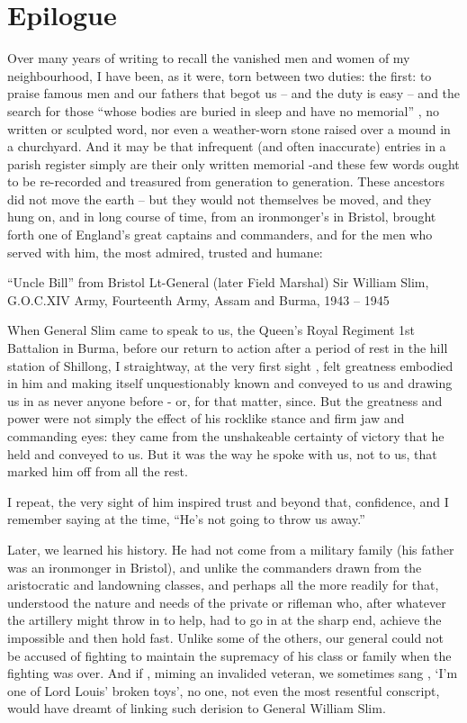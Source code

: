 \chapter{Epilogue}

Over many years of writing to recall the vanished men and women of my neighbourhood, I have been, as it were, torn between two duties: the first: to praise famous men and our fathers that begot us – and the duty is easy – and the search for those “whose bodies are buried in sleep and have no memorial” , no written or sculpted word, nor even a weather-worn stone raised over a mound in a churchyard. And it may be that  infrequent (and often inaccurate) entries in a parish register simply are their only written memorial -and these few words ought to be re-recorded and treasured from generation to generation. These ancestors did not move the earth – but they would not themselves be moved, and they hung on, and in long course of time, from an ironmonger’s in Bristol, brought forth one of  England’s great captains and commanders, and for the men who served with him, the most admired, trusted and humane: 

“Uncle Bill”  from Bristol                                                                                                                                                                           
                                                 Lt-General (later Field Marshal) Sir William Slim, G.O.C.XIV Army, Fourteenth Army, Assam and Burma, 1943 – 1945                                        
  
When General Slim came to speak to us, the Queen’s Royal Regiment 1st Battalion in Burma, before our return to action after a period of rest in the  hill station of Shillong, I straightway, at the very first sight , felt greatness embodied in him and making itself unquestionably known and conveyed to us and drawing us in as never anyone before -  or, for that matter, since. But the greatness and power were not simply the effect of his rocklike stance and firm  jaw and commanding eyes: they came from the unshakeable certainty of victory that he held and conveyed to us. But it was the way he spoke with us, not to us, that marked him off from all the rest.

I repeat, the very sight of him inspired trust and beyond that, confidence, and I remember saying at the time, “He’s not going to throw us away.”

Later, we learned his history. He had not come from a military family (his father was an ironmonger in Bristol), and unlike the commanders drawn from the aristocratic and landowning classes,   and perhaps all the more readily for that,  understood the nature and needs of the private or rifleman who, after whatever the artillery might throw in to help, had to go in at the sharp end, achieve the impossible and then hold fast.   Unlike some of the others, our general  could not be accused of fighting  to maintain  the supremacy  of his class or family when the fighting was over. And if , miming an invalided veteran, we sometimes sang , ‘I’m one of Lord Louis’ broken toys’, no one, not even the most resentful  conscript, would have dreamt of linking such derision  to General William Slim.   

